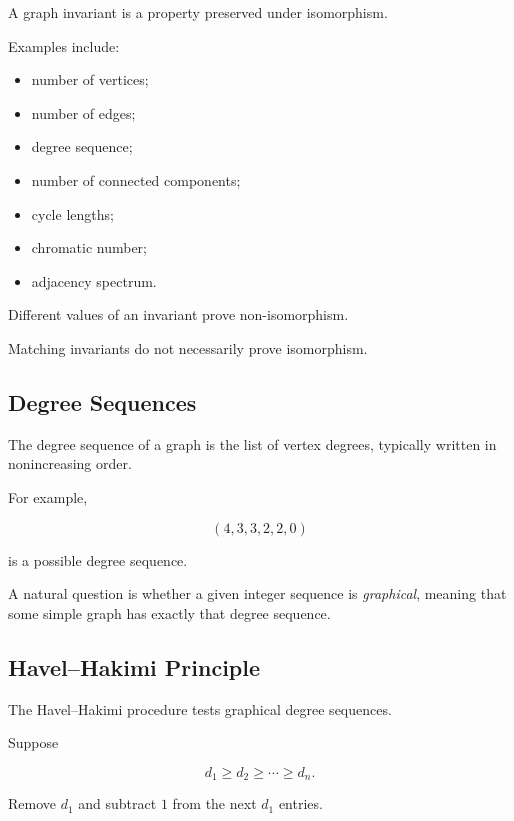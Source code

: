 A graph invariant is a property preserved under isomorphism.

Examples include:

\begin{itemize}
    \item number of vertices;
    \item number of edges;
    \item degree sequence;
    \item number of connected components;
    \item cycle lengths;
    \item chromatic number;
    \item adjacency spectrum.
\end{itemize}

Different values of an invariant prove non-isomorphism.

Matching invariants do not necessarily prove isomorphism.

\subsection{Degree Sequences}
\label{subsec:degree-sequences}

The degree sequence of a graph is the list of vertex degrees, typically
written in nonincreasing order.

For example,

\[
\boxed{
(4,3,3,2,2,0)
}
\]

is a possible degree sequence.

A natural question is whether a given integer sequence is
\emph{graphical}, meaning that some simple graph has exactly that
degree sequence.

\subsection{Havel--Hakimi Principle}
\label{subsec:havel-hakimi}

The Havel--Hakimi procedure tests graphical degree sequences.

Suppose

\[
d_1\geq d_2\geq\cdots\geq d_n.
\]

Remove \(d_1\) and subtract \(1\) from the next \(d_1\) entries.

